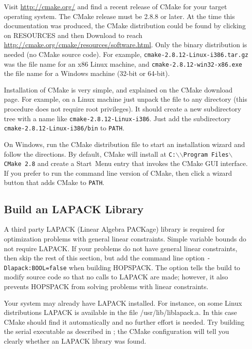 Visit \href{http://cmake.org/}{http://cmake.org/} and find a recent release
of CMake for your target operating system.  The CMake release must be 2.8.8
or later.  At the time this documentation was produced, the CMake distribution
could be found by clicking on {\sf RESOURCES} and then {\sf Download} to reach
\href{http://cmake.org/cmake/resources/software.html}
     {http://cmake.org/cmake/resources/software.html}.
Only the binary distribution is needed (no CMake source code).
For example, {\tt cmake-2.8.12-Linux-i386.tar.gz} was the file name for
an x86 Linux machine, and {\tt cmake-2.8.12-win32-x86.exe}
the file name for a Windows machine (32-bit or 64-bit).

Installation of CMake is very simple, and explained on the CMake download page.
For example, on a Linux machine just unpack the file to any directory
(this procedure does not require root privileges).
It should create a new subdirectory tree with a name like
{\tt cmake-2.8.12-Linux-i386}.
Just add the subdirectory {\tt cmake-2.8.12-Linux-i386/bin} to {\tt PATH}.

On Windows, run the CMake distribution file to start an installation wizard
and follow the directions.  By default, CMake will install at
{\tt C:$\backslash$$\backslash$Program~Files$\backslash$CMake~2.8}
and create a {\sf Start~Menu} entry that invokes the CMake GUI interface.
If you prefer to run the command line version of CMake, then click a wizard
button that adds CMake to {\tt PATH}.


\subsection{Build an LAPACK Library}
\label{subinstall:LA}

A third party LAPACK (Linear Algebra PACKage) library is required for
optimization problems with general linear constraints.  Simple variable bounds
do not require LAPACK.  If your problems do not have general linear constraints,
then skip the rest of this section, but add the command line option
{\tt -Dlapack:BOOL=false} when building HOPSPACK.  The option tells the build to
modify source code so that no calls to LAPACK are made; however, it also prevents
HOPSPACK from solving problems with linear constraints.

Your system may already have LAPACK installed.  For instance, on some Linux
distributions LAPACK is available in the file {\sf /usr/lib/liblapack.a}.
In this case CMake should find it automatically and no further effort is
needed.  Try building the serial executable as described in
; the CMake configuration will tell you clearly
whether an LAPACK library was found.

